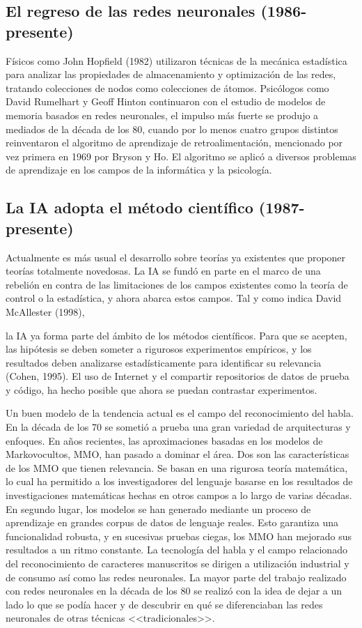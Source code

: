\documentclass{article}
\begin{document}
\subsection{El regreso de las redes neuronales (1986-presente)}

 Físicos como John Hopfield (1982) utilizaron técnicas de la mecánica estadística para analizar las propiedades de almacenamiento y optimización de las redes, tratando colecciones de nodos como colecciones de átomos. Psicólogos como David Rumelhart y Geoff Hinton continuaron con el estudio de modelos de memoria basados en redes neuronales,  el impulso más fuerte se produjo a mediados de la década de los 80, cuando por lo menos cuatro grupos distintos reinventaron el algoritmo de aprendizaje de retroalimentación, mencionado por vez primera en 1969 por Bryson y Ho. El algoritmo se aplicó a diversos problemas de aprendizaje en los campos de la informática y la psicología.

\subsection{La IA adopta el método científico (1987-presente)}

 Actualmente es más usual el desarrollo sobre teorías ya existentes que proponer teorías totalmente novedosas. La IA se fundó en parte en el marco de una rebelión en contra de las limitaciones de los campos existentes como la teoría de control o la estadística, y ahora abarca estos campos. Tal y como indica David McAllester (1998), 
 
  la IA ya forma parte del ámbito de los métodos científicos. Para que se acepten, las hipótesis se deben someter a rigurosos experimentos empíricos, y los resultados deben analizarse estadísticamente para identificar su relevancia (Cohen, 1995). El uso de Internet y el compartir repositorios de datos de prueba y código, ha hecho posible que ahora se puedan contrastar experimentos. 
  
  Un buen modelo de la tendencia actual es el campo del reconocimiento del habla. En la década de los 70 se sometió a prueba una gran variedad de arquitecturas y enfoques.  En años recientes, las aproximaciones basadas en los modelos de Markovocultos, MMO, han pasado a dominar el área. Dos son las características de los MMO que tienen relevancia. Se basan en una rigurosa teoría matemática, lo cual ha permitido a los investigadores del lenguaje basarse en los resultados de investigaciones matemáticas hechas en otros campos a lo largo de varias décadas. En segundo lugar, los modelos se han generado mediante un proceso de aprendizaje en grandes corpus de datos de lenguaje reales. Esto garantiza una funcionalidad robusta, y en sucesivas pruebas ciegas, los MMO han mejorado sus resultados a un ritmo constante.  La tecnología del habla y el campo relacionado del reconocimiento de caracteres manuscritos se dirigen a utilización industrial y de consumo así como las redes neuronales. La mayor parte del trabajo realizado con redes neuronales en la década de los 80 se realizó con la idea de dejar a un lado lo que se podía hacer y de descubrir en qué se diferenciaban las redes neuronales de otras técnicas <<tradicionales>>.
  
\end{document}
